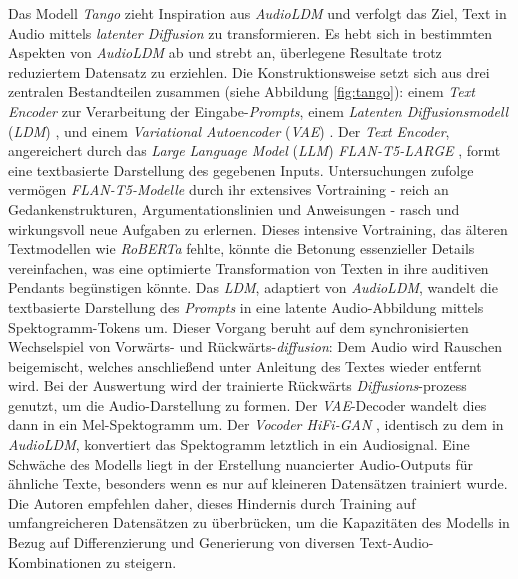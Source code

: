 \documentclass[
  a4paper,  %
  twoside,  %
  bibliography=totoc,
  headsepline,
  cleardoublepage=empty,
  parskip=half,
  draft=false
]{scrbook}
\begin{document}
Das Modell \emph{Tango} \cite{ghosal_text--audio_2023} zieht Inspiration aus \emph{AudioLDM} und verfolgt das Ziel, Text in Audio mittels \emph{latenter Diffusion} zu transformieren. Es hebt sich in bestimmten Aspekten von \emph{AudioLDM} ab und strebt an, überlegene Resultate trotz reduziertem Datensatz zu erziehlen. Die Konstruktionsweise setzt sich aus drei zentralen Bestandteilen zusammen (siehe Abbildung \ref{fig:tango}): einem \emph{Text Encoder} zur Verarbeitung der Eingabe-\emph{Prompts}, einem \emph{Latenten Diffusionsmodell} (\emph{LDM}) \cite{rombach_high-resolution_2022}, und einem \emph{Variational Autoencoder} (\emph{VAE}) \cite{kingma_auto-encoding_2022}. Der \emph{Text Encoder}, angereichert durch das \emph{Large Language Model} (\emph{LLM}) \emph{FLAN-T5-LARGE} \cite{chung_scaling_2022}, formt eine textbasierte Darstellung des gegebenen Inputs. Untersuchungen \cite{dai_why_2023} zufolge vermögen \emph{FLAN-T5-Modelle} durch ihr extensives Vortraining - reich an Gedankenstrukturen, Argumentationslinien und Anweisungen - rasch und wirkungsvoll neue Aufgaben zu erlernen. Dieses intensive Vortraining, das älteren Textmodellen wie \emph{RoBERTa} \cite{liu_roberta_2019} fehlte, könnte die Betonung essenzieller Details vereinfachen, was eine optimierte Transformation von Texten in ihre auditiven Pendants begünstigen könnte. Das \emph{LDM}, adaptiert von \emph{AudioLDM}, wandelt die textbasierte Darstellung des \emph{Prompts} in eine latente Audio-Abbildung mittels Spektogramm-Tokens um. Dieser Vorgang beruht auf dem synchronisierten Wechselspiel von Vorwärts- und Rückwärts-\emph{diffusion}: Dem Audio wird Rauschen beigemischt, welches anschließend unter Anleitung des Textes wieder entfernt wird. Bei der Auswertung wird der trainierte Rückwärts \emph{Diffusions}-prozess genutzt, um die Audio-Darstellung zu formen. Der \emph{VAE}-Decoder wandelt dies dann in ein Mel-Spektogramm um. Der \emph{Vocoder HiFi-GAN} \cite{kong_hifi-gan_2020}, identisch zu dem in \emph{AudioLDM}, konvertiert das Spektogramm letztlich in ein Audiosignal. Eine Schwäche des Modells liegt in der Erstellung nuancierter Audio-Outputs für ähnliche Texte, besonders wenn es nur auf kleineren Datensätzen trainiert wurde. Die Autoren empfehlen daher, dieses Hindernis durch Training auf umfangreicheren Datensätzen zu überbrücken, um die Kapazitäten des Modells in Bezug auf Differenzierung und Generierung von diversen Text-Audio-Kombinationen zu steigern. \cite{ghosal_text--audio_2023}
\end{document}
